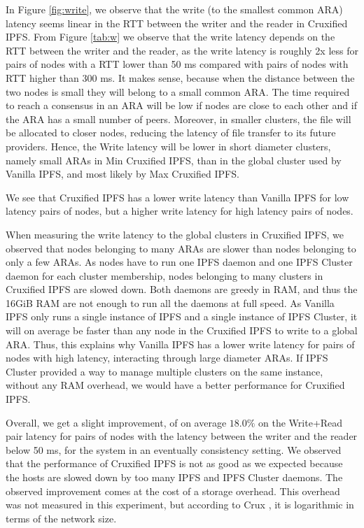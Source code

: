 \documentclass[a4paper,11pt,oneside]{report}
\begin{document}
In Figure \ref{fig:write}, we observe that the write (to the smallest common ARA) latency seems linear in the RTT between the writer and the reader in Cruxified IPFS. From Figure \ref{tab:w} we observe that the write latency depends on the RTT between the writer and the reader, as the write latency is roughly 2x less for pairs of nodes with a RTT lower than 50 ms compared with pairs of nodes with RTT higher than 300 ms. It makes sense, because when the distance between the two nodes is small they will belong to a small common ARA. The time required to reach a consensus in an ARA will be low if nodes are close to each other and if the ARA has a small number of peers. Moreover, in smaller clusters, the file will be allocated to closer nodes, reducing the latency of file transfer to its future providers. Hence, the Write latency will be lower in short diameter clusters, namely small ARAs in Min Cruxified IPFS, than in the global cluster used by Vanilla IPFS, and most likely by Max Cruxified IPFS.


We see that Cruxified IPFS has a lower write latency than Vanilla IPFS for low latency pairs of nodes, but a higher write latency for high latency pairs of nodes. 

When measuring the write latency to the global clusters in Cruxified IPFS, we observed that nodes belonging to many ARAs are slower than nodes belonging to only a few ARAs. As nodes have to run one IPFS daemon and one IPFS Cluster daemon for each cluster membership, nodes belonging to many clusters in Cruxified IPFS are slowed down. Both daemons are greedy in RAM, and thus the 16GiB RAM are not enough to run all the daemons at full speed. As Vanilla IPFS only runs a single instance of IPFS and a single instance of IPFS Cluster, it will on average be faster than any node in the Cruxified IPFS to write to a global ARA. Thus, this explains why Vanilla IPFS has a lower write latency for pairs of nodes with high latency, interacting through large diameter ARAs. If IPFS Cluster provided a way to manage multiple clusters on the same instance, without any RAM overhead, we would have a better performance for Cruxified IPFS.

Overall, we get a slight improvement, of on average $18.0\%$ on the Write+Read pair latency for pairs of nodes with the latency between the writer and the reader below 50 ms, for the system in an eventually consistency setting. We observed that the performance of Cruxified IPFS is not as good as we expected because the hosts are slowed down by too many IPFS and IPFS Cluster daemons. The observed improvement comes at the cost of a storage overhead. This overhead was not measured in this experiment, but according to Crux \cite{crux}, it is logarithmic in terms of the network size.
\end{document}
